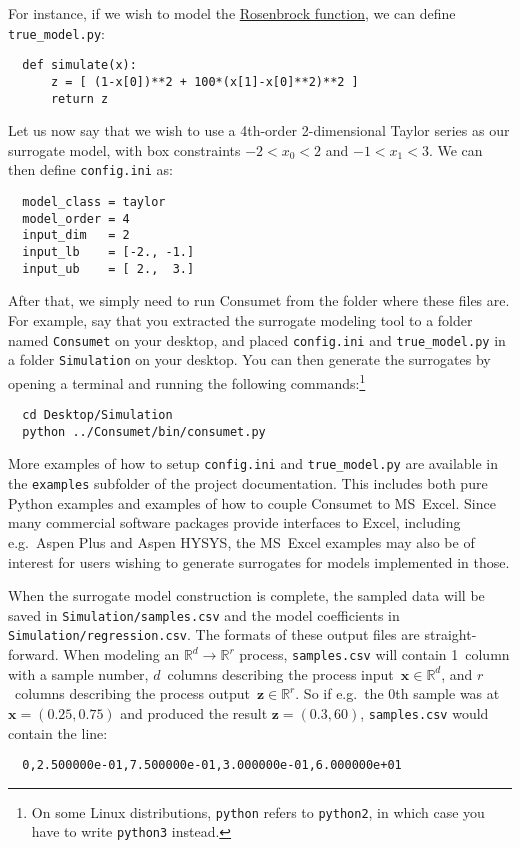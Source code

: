 \documentclass[a4paper,bibliography=numbered]{scrartcl}
\begin{document}
\newpage
For instance, if we wish to model the \href{https://en.wikipedia.org/wiki/Rosenbrock_function}{Rosenbrock function}, we can define \texttt{true\_model.py}:
\begin{lstlisting}
  def simulate(x): 
      z = [ (1-x[0])**2 + 100*(x[1]-x[0]**2)**2 ]
      return z
\end{lstlisting}
Let us now say that we wish to use a 4th-order 2-dimensional Taylor series as our surrogate model, with box constraints $-2 < x_0 < 2$ and $-1 < x_1 < 3$.
We can then define \texttt{config.ini} as:
\begin{lstlisting}
  model_class = taylor
  model_order = 4
  input_dim   = 2
  input_lb    = [-2., -1.]
  input_ub    = [ 2.,  3.]
\end{lstlisting}
After that, we simply need to run Consumet from the folder where these files are.
For example, say that you extracted the surrogate modeling tool to a folder named \texttt{Consumet} on your desktop, and placed \texttt{config.ini} and \texttt{true\_model.py} in a folder \texttt{Simulation} on your desktop.
You can then generate the surrogates by opening a terminal and running the following commands:\footnote{On some Linux distributions, \texttt{python} refers to \texttt{python2}, in which case you have to write \texttt{python3} instead.}
\begin{lstlisting}
  cd Desktop/Simulation
  python ../Consumet/bin/consumet.py
\end{lstlisting}
More examples of how to setup \texttt{config.ini} and \texttt{true\_model.py} are available in the \texttt{examples} subfolder of the project documentation.
This includes both pure Python examples and examples of how to couple Consumet to MS~Excel.
Since many commercial software packages provide interfaces to Excel, including e.g.\ Aspen Plus and Aspen HYSYS, the MS~Excel examples may also be of interest for users wishing to generate surrogates for models implemented in those.

When the surrogate model construction is complete, the sampled data will be saved in \texttt{Simulation/samples.csv} and the model coefficients in \texttt{Simulation/regression.csv}.
The formats of these output files are straight-forward.
When modeling an $\mathbb{R}^d \rightarrow \mathbb{R}^r$ process, \texttt{samples.csv} will contain 1~column with a sample number, $d$~columns describing the process input~$\bm{x}\in\mathbb{R}^d$, and $r$~columns describing the process output~$\bm{z}\in\mathbb{R}^r$.
So if e.g.\ the 0th sample was at $\bm{x} = (0.25,0.75)$ and produced the result $\bm{z} = (0.3,60)$, \texttt{samples.csv} would contain the line:
\begin{lstlisting}
  0,2.500000e-01,7.500000e-01,3.000000e-01,6.000000e+01
\end{lstlisting}
\end{document}
